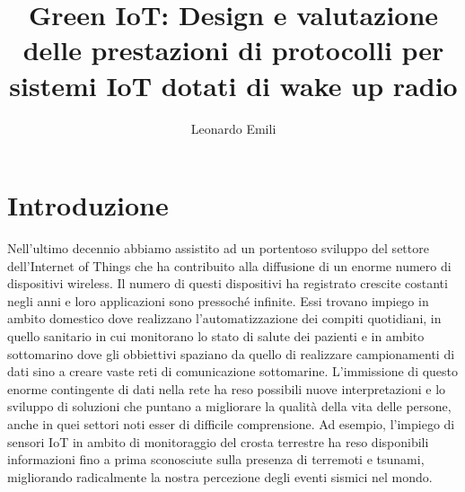 \documentclass[binding=0.6cm,Lau,noexaminfo]{sapthesis}
\title{Green IoT: Design e valutazione delle prestazioni di protocolli per sistemi IoT dotati di wake up radio}
\author{Leonardo Emili}
\begin{document}
\large

\frontmatter
\maketitle

\tableofcontents

\mainmatter
\chapter{Introduzione}


Nell'ultimo decennio abbiamo assistito ad un portentoso sviluppo del settore dell'Internet of Things che ha contribuito alla diffusione
di un enorme numero di dispositivi wireless. Il numero di questi dispositivi ha registrato crescite costanti negli anni e loro applicazioni sono pressoché infinite.
Essi trovano impiego in ambito domestico dove realizzano l'automatizzazione dei compiti quotidiani, in quello sanitario in cui monitorano lo stato di salute
dei pazienti e in ambito sottomarino dove gli obbiettivi spaziano da quello di realizzare campionamenti di dati sino a creare vaste reti di comunicazione sottomarine.
L'immissione di questo enorme contingente di dati nella rete ha reso possibili nuove interpretazioni e lo sviluppo di soluzioni che puntano a
migliorare la qualità della vita delle persone, anche in quei settori noti esser di difficile comprensione. Ad esempio, l'impiego di sensori IoT in ambito di
monitoraggio del crosta terrestre ha reso disponibili informazioni fino a prima sconosciute sulla presenza di terremoti e tsunami, migliorando radicalmente
la nostra percezione degli eventi sismici nel mondo.\\
\end{document}
